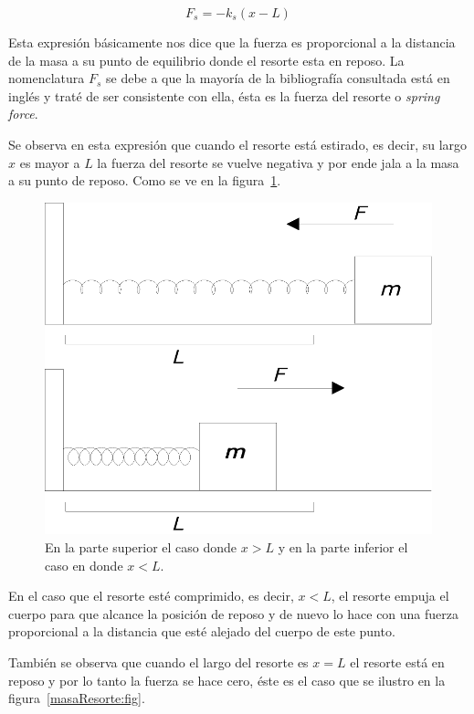 \begin{equation}
F_s = -k_s \left( x - L \right)
\end{equation}

Esta expresión básicamente nos dice que la fuerza es proporcional a la distancia de la masa a su punto de equilibrio donde el resorte esta en reposo. La nomenclatura $F_s$ se debe a que la mayoría de la bibliografía consultada está en inglés y traté de ser consistente con ella, ésta es la fuerza del resorte o \emph{\foreignlanguage{english}{spring force}}.

Se observa en esta expresión que cuando el resorte está estirado, es decir, su largo $x$ es mayor a $L$ la fuerza del resorte se vuelve negativa y por ende jala a la masa a su punto de reposo. Como se ve en la figura~\ref{leyHokke:fig}.

\begin{figure}
 \centering
 \includegraphics[]{Img/varias_masas}
 \caption[Ley de Hooke para resortes]{ 
 En la parte superior el caso donde $x>L$ y en la parte inferior el caso en donde $x<L$.
 } \label{leyHokke:fig}
\end{figure}

En el caso que el resorte esté comprimido, es decir, $ x < L$, el resorte empuja el cuerpo para que alcance la posición de reposo y de nuevo lo hace con una fuerza proporcional a la distancia que esté alejado del cuerpo de este punto. 

También se observa que cuando el largo del resorte es $ x = L$ el resorte está en reposo y por lo tanto la fuerza se hace cero, éste es el caso que se ilustro en la figura~\ref{masaResorte:fig}.

